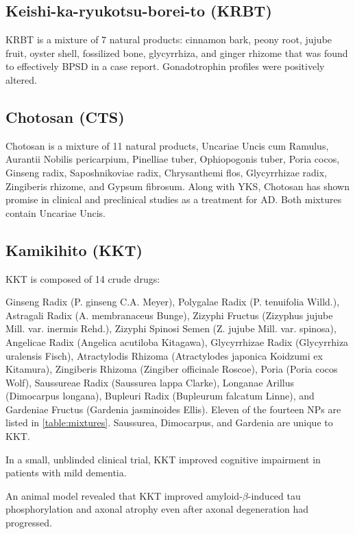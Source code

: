 \subsection{Keishi-ka-ryukotsu-borei-to (KRBT)}

KRBT is a mixture of 7 natural products:
cinnamon bark,
peony root,
jujube fruit,
oyster shell,
fossilized bone,
glycyrrhiza,
and ginger rhizome
that was found to effectively BPSD in a case report.
Gonadotrophin profiles were positively altered.
\cite{niitsu2013behavioural}




\subsection{Chotosan (CTS)}
Chotosan is a mixture of 11 natural products,
Uncariae Uncis cum Ramulus,
Aurantii Nobilis pericarpium,
Pinelliae tuber,
Ophiopogonis tuber,
Poria cocos,
Ginseng radix,
Saposhnikoviae radix,
Chrysanthemi flos,
Glycyrrhizae radix,
Zingiberis rhizome,
and Gypsum fibrosum.
Along with YKS, Chotosan has shown promise in clinical and
preclinical studies as a treatment for AD.
Both mixtures contain Uncariae Uncis.
\cite{matsumoto2013kampo}



\subsection{Kamikihito (KKT)}
KKT is composed of 14 crude drugs:

Ginseng Radix (P. ginseng C.A. Meyer),
Polygalae Radix (P. tenuifolia Willd.),
Astragali Radix (A. membranaceus Bunge),
Zizyphi Fructus (Zizyphus jujube Mill. var. inermis Rehd.),
Zizyphi Spinosi Semen (Z. jujube Mill. var. spinosa),
Angelicae Radix (Angelica acutiloba Kitagawa),
Glycyrrhizae Radix (Glycyrrhiza uralensis Fisch),
Atractylodis Rhizoma (Atractylodes japonica Koidzumi ex Kitamura),
Zingiberis Rhizoma (Zingiber officinale Roscoe),
Poria (Poria cocos Wolf),
Saussureae Radix (Saussurea lappa Clarke),
Longanae Arillus (Dimocarpus longana),
Bupleuri Radix (Bupleurum falcatum Linne), and
Gardeniae Fructus (Gardenia jasminoides Ellis).
Eleven of the fourteen NPs are listed in \ref{table:mixtures}.
Saussurea, Dimocarpus, and Gardenia are unique to KKT.

In a small, unblinded clinical trial, KKT improved cognitive impairment in
patients with mild dementia.
\cite{arai2015effectiveness}

An animal model revealed that KKT
improved amyloid-$\beta$-induced tau phosphorylation and axonal atrophy
even after axonal degeneration had progressed.
\cite{watari2014new, watari2015comparing}



